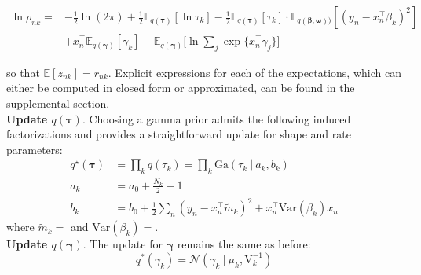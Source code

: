 \documentclass[twoside,11pt]{article}
\newcommand{\tr}{\intercal}
\newcommand\given[1][]{\:#1\vert\:}
\newcommand{\transpose}[1]{#1^{\intercal}}
\newcommand{\nsum}{\sum\limits_{n}}
\newcommand{\boldbeta}{\boldsymbol\beta}
\newcommand{\boldgamma}{\boldsymbol\gamma}
\newcommand{\boldtau}{\boldsymbol\tau}
\newcommand{\E}{\mathbb{E}}
\newcommand{\var}[1]{\mathrm{Var}\left(#1\right)}
\begin{document}
\begin{equation} \label{eq:ln_rho_vs}
\begin{split}
 \ln \rho_{nk} = &-\frac{1}{2}\ln(2\pi) + \frac{1}{2} \E_{q(\boldsymbol\tau)}[ \ln \tau_k ] - \frac{1}{2} \E_{q(\boldsymbol\tau)}[\tau_k] \cdot \E_{q(\boldbeta, \boldsymbol\omega))}[(y_n - x_n^{\tr}\beta_k)^2] \\ 
	& + x_n^{\tr}\E_{q(\boldsymbol\gamma)}[\gamma_k] - \E_{q(\boldsymbol\gamma)}\Bigg[\ln \sum_{j} \exp \{ x_n^{\tr} \gamma_j \}\Bigg]
\end{split}
\end{equation}

so that $\E[z_{nk}] = r_{nk}$. Explicit expressions for each of the expectations, which can either be computed in closed form or approximated, can be found in the supplemental section. \\


\textbf{Update $q \left(  \boldtau \right)$}. Choosing a gamma prior admits the following induced factorizations and provides a straightforward update for shape and rate parameters:
\begin{align}
	q^{\star} \left( \boldtau \right) & = \prod_{k} q \left( \tau_k \right) = \prod_{k} \mathrm{Ga} \left( \tau_k \given a_k, b_k \right) \label{eq:q_gamma_vs} \\
	a_k &= a_0 + \frac{N_k}{2} - 1 \label{eq:ak_vs} \\
	b_k &= b_0 + \frac{1}{2} \nsum (y_n -\transpose{x_n} \tilde{m}_k)^2 + \transpose{x_n}\var{\beta_k} x_n \label{eq:bk_vs}
\end{align}
where $\tilde{m}_k = $ and $\var{\beta_k} = $. \\

\textbf{Update $q \left(  \boldgamma \right)$}. The update for $\boldgamma$ remains the same as before:
\begin{equation} \label{optimal_gamma}
	q^{*}(\gamma_k) = \mathcal{N} \left( \gamma_k \given \mu_k, \mathrm{V}_k^{-1} \right)
\end{equation}
\end{document}
